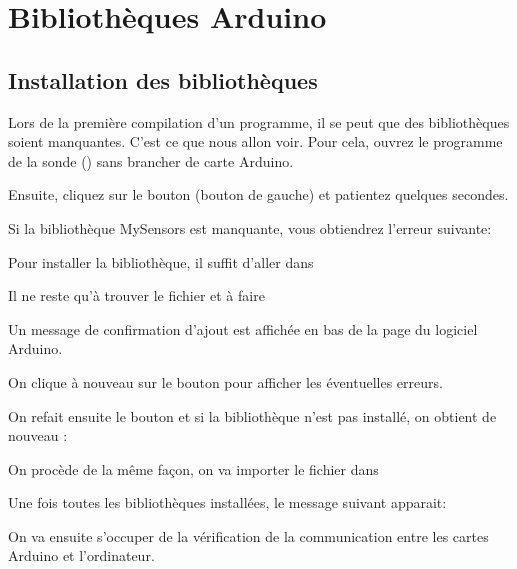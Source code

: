 \chapter{Bibliothèques Arduino}

\section{Installation des bibliothèques}

Lors de la première compilation d'un programme, il se peut que des bibliothèques soient manquantes.
C'est ce que nous allon voir. Pour cela, ouvrez le programme de la sonde () sans brancher de carte Arduino.

Ensuite, cliquez sur le bouton  (bouton de gauche) et patientez quelques secondes.\\


Si la bibliothèque MySensors est manquante, vous obtiendrez l'erreur suivante: 


Pour installer la bibliothèque, il suffit d'aller dans 


Il ne reste qu'à trouver le fichier  et à faire 


Un message de confirmation d'ajout est affichée en bas de la page du logiciel Arduino.


On clique à nouveau sur le bouton  pour afficher les éventuelles erreurs.

 

On refait ensuite le bouton  et si la bibliothèque  n'est pas installé, on obtient de nouveau : 


On procède de la même façon, on va importer le fichier  dans 

Une fois toutes les bibliothèques installées, le message suivant apparait: 


On va ensuite s'occuper de la vérification de la communication entre les cartes Arduino et l'ordinateur.